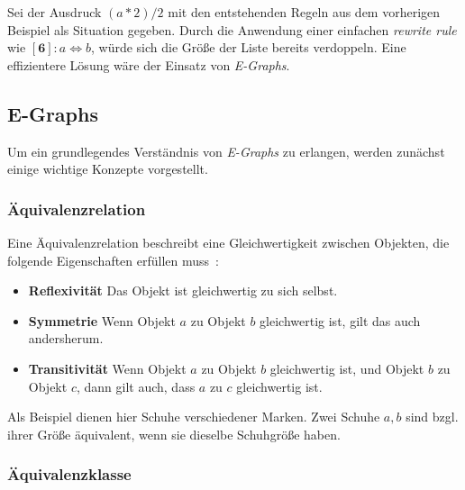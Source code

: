 Sei der Ausdruck $(a * 2) / 2$ mit den entstehenden Regeln aus dem vorherigen Beispiel als Situation gegeben. Durch die Anwendung einer einfachen \textit{rewrite rule} wie 
$[\mathbf{6}]: a \Leftrightarrow b$, würde sich die Größe der Liste bereits verdoppeln.
Eine effizientere Lösung wäre der Einsatz von \textit{E-Graphs}.


\subsection{E-Graphs}

Um ein grundlegendes Verständnis von \textit{E-Graphs} zu erlangen, werden zunächst einige wichtige Konzepte vorgestellt.

\subsubsection{Äquivalenzrelation}

Eine Äquivalenzrelation beschreibt eine Gleichwertigkeit zwischen Objekten, die folgende Eigenschaften erfüllen muss~\cite{Ehrig2001}:

\begin{itemize}
  \item \textbf{Reflexivität} Das Objekt ist gleichwertig zu sich selbst.
  \item \textbf{Symmetrie} Wenn Objekt $a$ zu Objekt $b$ gleichwertig ist, gilt das auch andersherum.
  \item \textbf{Transitivität} Wenn Objekt $a$ zu Objekt $b$ gleichwertig ist, und Objekt $b$ zu Objekt $c$, dann gilt auch, dass $a$ zu $c$ gleichwertig ist.
\end{itemize}

Als Beispiel dienen hier Schuhe verschiedener Marken. Zwei Schuhe $a, b$ sind bzgl. ihrer Größe äquivalent, wenn sie dieselbe Schuhgröße haben. 

\subsubsection{Äquivalenzklasse}

